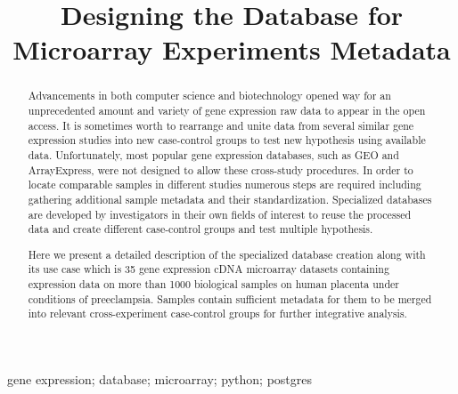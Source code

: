 \documentclass[conference]{IEEEtran}
\begin{document}
\title{Designing the Database for Microarray Experiments Metadata}

\author{
}

\maketitle

\thispagestyle{fancy}



\begin{abstract}
Advancements in both computer science and biotechnology opened way for an unprecedented amount and variety of gene expression raw data to appear in the open access. It is sometimes worth to rearrange and unite data from several similar gene expression studies into new case-control groups to test new hypothesis using available data. Unfortunately, most popular gene expression databases, such as GEO and ArrayExpress, were not designed to allow these cross-study procedures. In order to locate comparable  samples in different studies numerous steps are required including gathering additional sample metadata and their standardization. Specialized databases are developed by investigators in their own fields of interest to reuse the processed data and create different case-control groups and test multiple hypothesis.

Here we present a detailed description of the specialized database creation along with its use case which is 35 gene expression cDNA microarray datasets containing expression data on more than 1000 biological samples on human placenta under conditions of preeclampsia. Samples contain sufficient metadata for them to be merged into relevant cross-experiment case-control groups for further integrative analysis.
\end{abstract}

\begin{keywords}
gene expression; database; microarray; python; postgres
\end{keywords}
\end{document}

